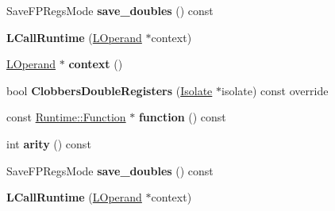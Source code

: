 \begin{DoxyCompactItemize}
\item 
Save\+F\+P\+Regs\+Mode {\bfseries save\+\_\+doubles} () const \hypertarget{classv8_1_1internal_1_1_l_call_runtime_abaa882f65ae172f9475a0ae3ff632509}{}\label{classv8_1_1internal_1_1_l_call_runtime_abaa882f65ae172f9475a0ae3ff632509}

\item 
{\bfseries L\+Call\+Runtime} (\hyperlink{classv8_1_1internal_1_1_l_operand}{L\+Operand} $\ast$context)\hypertarget{classv8_1_1internal_1_1_l_call_runtime_a0944b0ab9e1843075170591acb313644}{}\label{classv8_1_1internal_1_1_l_call_runtime_a0944b0ab9e1843075170591acb313644}

\item 
\hyperlink{classv8_1_1internal_1_1_l_operand}{L\+Operand} $\ast$ {\bfseries context} ()\hypertarget{classv8_1_1internal_1_1_l_call_runtime_a53d124954c165c48517bcb9163072229}{}\label{classv8_1_1internal_1_1_l_call_runtime_a53d124954c165c48517bcb9163072229}

\item 
bool {\bfseries Clobbers\+Double\+Registers} (\hyperlink{classv8_1_1internal_1_1_isolate}{Isolate} $\ast$isolate) const  override\hypertarget{classv8_1_1internal_1_1_l_call_runtime_a4bf2712add569c33e2d6106c63c0f1ff}{}\label{classv8_1_1internal_1_1_l_call_runtime_a4bf2712add569c33e2d6106c63c0f1ff}

\item 
const \hyperlink{structv8_1_1internal_1_1_runtime_1_1_function}{Runtime\+::\+Function} $\ast$ {\bfseries function} () const \hypertarget{classv8_1_1internal_1_1_l_call_runtime_ac92d3ff58d96d75e965c38dbbc3ae1ee}{}\label{classv8_1_1internal_1_1_l_call_runtime_ac92d3ff58d96d75e965c38dbbc3ae1ee}

\item 
int {\bfseries arity} () const \hypertarget{classv8_1_1internal_1_1_l_call_runtime_a48b7ab12a64bdad01522b517180dc1f9}{}\label{classv8_1_1internal_1_1_l_call_runtime_a48b7ab12a64bdad01522b517180dc1f9}

\item 
Save\+F\+P\+Regs\+Mode {\bfseries save\+\_\+doubles} () const \hypertarget{classv8_1_1internal_1_1_l_call_runtime_abaa882f65ae172f9475a0ae3ff632509}{}\label{classv8_1_1internal_1_1_l_call_runtime_abaa882f65ae172f9475a0ae3ff632509}

\item 
{\bfseries L\+Call\+Runtime} (\hyperlink{classv8_1_1internal_1_1_l_operand}{L\+Operand} $\ast$context)\hypertarget{classv8_1_1internal_1_1_l_call_runtime_a0944b0ab9e1843075170591acb313644}{}\label{classv8_1_1internal_1_1_l_call_runtime_a0944b0ab9e1843075170591acb313644}


\end{DoxyCompactItemize}
